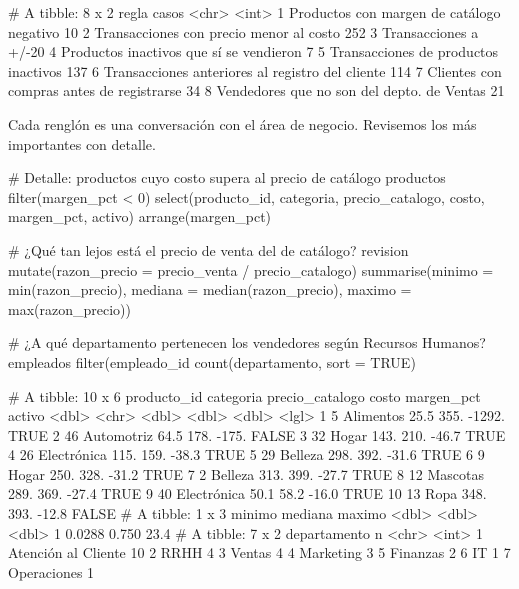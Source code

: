 \begin{rsalida}
# A tibble: 8 x 2
  regla                                            casos
  <chr>                                            <int>
1 Productos con margen de catálogo negativo           10
2 Transacciones con precio menor al costo            252
3 Transacciones a +/-20%
4 Productos inactivos que sí se vendieron              7
5 Transacciones de productos inactivos               137
6 Transacciones anteriores al registro del cliente   114
7 Clientes con compras antes de registrarse           34
8 Vendedores que no son del depto. de Ventas          21
\end{rsalida}

Cada renglón es una conversación con el área de negocio. Revisemos los más
importantes con detalle.

\begin{rcode}
# Detalle: productos cuyo costo supera al precio de catálogo
productos %
  filter(margen_pct < 0) %
  select(producto_id, categoria, precio_catalogo, costo, margen_pct,
         activo) %
  arrange(margen_pct)

# ¿Qué tan lejos está el precio de venta del de catálogo?
revision %
  mutate(razon_precio = precio_venta / precio_catalogo) %
  summarise(minimo  = min(razon_precio),
            mediana = median(razon_precio),
            maximo  = max(razon_precio))

# ¿A qué departamento pertenecen los vendedores según Recursos Humanos?
empleados %
  filter(empleado_id %
  count(departamento, sort = TRUE)
\end{rcode}

\begin{rsalida}
# A tibble: 10 x 6
   producto_id categoria   precio_catalogo costo margen_pct activo
         <dbl> <chr>                 <dbl> <dbl>      <dbl> <lgl> 
 1           5 Alimentos              25.5 355.     -1292.  TRUE  
 2          46 Automotriz             64.5 178.      -175.  FALSE 
 3          32 Hogar                 143.  210.       -46.7 TRUE  
 4          26 Electrónica           115.  159.       -38.3 TRUE  
 5          29 Belleza               298.  392.       -31.6 TRUE  
 6           9 Hogar                 250.  328.       -31.2 TRUE  
 7           2 Belleza               313.  399.       -27.7 TRUE  
 8          12 Mascotas              289.  369.       -27.4 TRUE  
 9          40 Electrónica            50.1  58.2      -16.0 TRUE  
10          13 Ropa                  348.  393.       -12.8 FALSE 
# A tibble: 1 x 3
  minimo mediana maximo
   <dbl>   <dbl>  <dbl>
1 0.0288   0.750   23.4
# A tibble: 7 x 2
  departamento            n
  <chr>               <int>
1 Atención al Cliente    10
2 RRHH                    4
3 Ventas                  4
4 Marketing               3
5 Finanzas                2
6 IT                      1
7 Operaciones             1
\end{rsalida}

